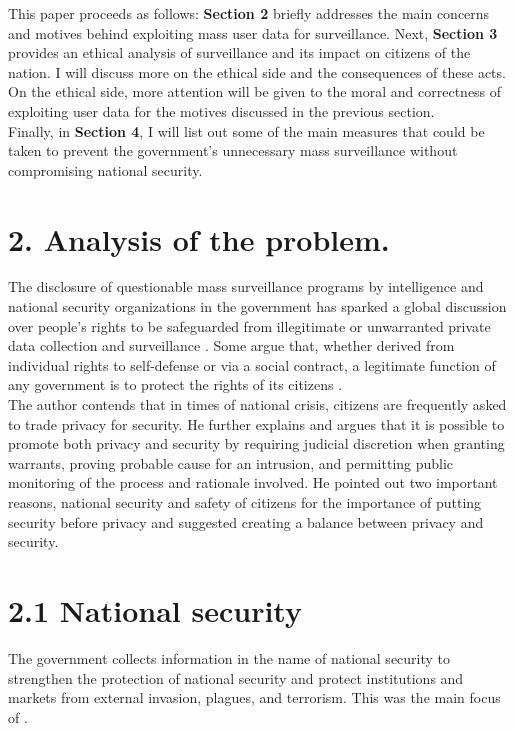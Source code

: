 \documentclass[11pt]{report}
\begin{document}
This paper proceeds as follows: \textbf{Section 2} briefly addresses the main concerns and motives behind exploiting mass user data for surveillance. Next, \textbf{Section 3} provides an ethical analysis of surveillance and its impact on citizens of the nation. I will discuss more on the ethical side and the consequences of these acts. On the ethical side, more attention will be given to the moral and correctness of exploiting user data for the motives discussed in the previous section. \\

Finally, in \textbf{Section 4}, I will list out some of the main measures that could be taken to prevent the government's unnecessary mass surveillance without compromising national security. 
\section*{2. Analysis of the problem.}
The disclosure of questionable mass surveillance programs by intelligence and national security organizations in the government has sparked a global discussion over people's rights to be safeguarded from illegitimate or unwarranted private data collection and surveillance \cite{masssurveillance}\cite{masssurveillance2}. Some argue that, whether derived from individual rights to self-defense or via a social contract, a legitimate function of any government is to protect the rights of its citizens \cite{mainREf}\cite{tyler}.\\

The author \cite{mainREf} contends that in times of national crisis, citizens are frequently asked to trade privacy for security.  He further explains and argues that it is possible to promote both privacy and security by requiring judicial discretion when granting warrants, proving probable cause for an intrusion, and permitting public monitoring of the process and rationale involved. He pointed out two important reasons, national security and safety of citizens  for the importance of putting security before privacy and suggested creating a balance between privacy and security. 
\section*{2.1 National security}
The government collects information in the name of national security to strengthen the protection of national security and protect institutions and markets from external invasion, plagues, and terrorism. This was the main focus of \cite{mainREf}.\\
\end{document}
